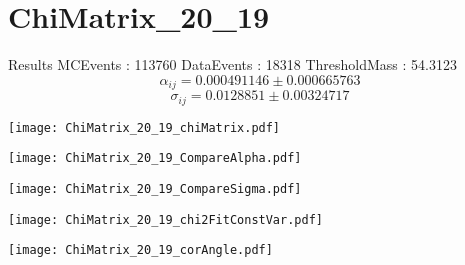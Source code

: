 \documentclass[a4paper,12pt]{article}
\begin{document}
\section{ChiMatrix\_20\_19}
\begin{minipage}{0.49\linewidth} Results \newline
MCEvents : 113760\newline
DataEvents : 18318 \newline
ThresholdMass : 54.3123\\
$$\alpha_{ij} = 0.000491146\pm 0.000665763$$
$$\sigma_{ij} = 0.0128851\pm 0.00324717$$
\end{minipage}\hfill
\begin{minipage}{0.49\linewidth} 
\texttt{[image: ChiMatrix\_20\_19\_chiMatrix.pdf]}\\
\end{minipage}
\hfill
\begin{minipage}{0.49\linewidth} 
\texttt{[image: ChiMatrix\_20\_19\_CompareAlpha.pdf]}\\
\end{minipage}
\hfill
\begin{minipage}{0.49\linewidth} 
\texttt{[image: ChiMatrix\_20\_19\_CompareSigma.pdf]}\\
\end{minipage}
\begin{minipage}{0.49\linewidth} 
\texttt{[image: ChiMatrix\_20\_19\_chi2FitConstVar.pdf]}\\
\end{minipage}
\hfill
\begin{minipage}{0.49\linewidth} 
\texttt{[image: ChiMatrix\_20\_19\_corAngle.pdf]}\\
\end{minipage}
\end{document}
